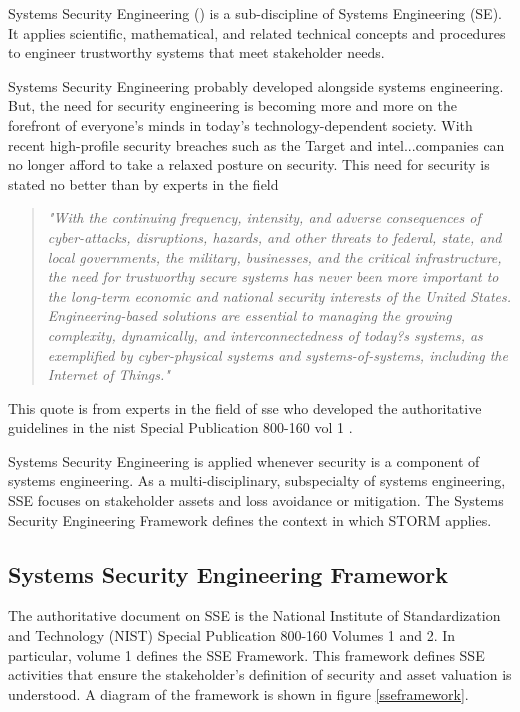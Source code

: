 \documentclass[../../main/main.tex]{subfiles}
\begin{document}
Systems Security Engineering () is a sub-discipline of Systems Engineering (SE).  It applies scientific, mathematical, and related technical concepts and procedures to engineer trustworthy systems that meet stakeholder needs. 

Systems Security Engineering probably developed alongside systems engineering.  But, the need for security engineering is becoming more and more on the forefront of everyone's minds in today's technology-dependent society.  With recent high-profile security breaches such as the Target and intel...companies can no longer afford to take a relaxed posture on security.  This need for security is stated no better than by experts in the field

\begin{quote}
\textit{"With the continuing frequency, intensity, and adverse consequences of cyber-attacks, disruptions, hazards, and other threats to federal, state, and local governments, the military, businesses, and the critical infrastructure, the need for trustworthy secure systems has never been more important to the long-term economic and national security interests of the United States. Engineering-based solutions are essential to managing the growing complexity, dynamically, and interconnectedness of today?s systems, as exemplified by cyber-physical systems and systems-of-systems, including the Internet of Things."}  \cite{NIST800160}
\end{quote}
 This quote is from experts in the field of \gls{sse} who developed the authoritative guidelines in the \Gls{nist} Special Publication 800-160 vol 1 \cite{NIST800160}.  



Systems Security Engineering is applied whenever security is a component of systems engineering.  As a multi-disciplinary, subspecialty of systems engineering, SSE focuses on stakeholder assets and loss avoidance or mitigation.  The Systems Security Engineering Framework defines the context in which STORM applies.
   

\subsection{Systems Security Engineering Framework}
The authoritative document on SSE is the National Institute of Standardization and Technology (NIST) Special Publication 800-160 Volumes 1 and 2.  In particular, volume 1 defines the SSE Framework.  This framework defines SSE activities that ensure the stakeholder's definition of security and asset valuation is understood.  A diagram of the framework is shown in figure \ref{sseframework}.
\end{document}
